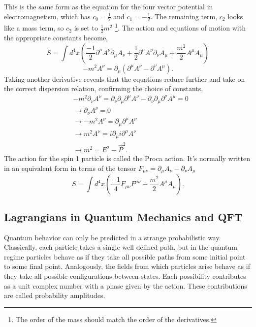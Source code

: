 This is the same form as the equation for the four vector potential in electromagnetism, which has $c_0 = \frac{1}{2}$ and $c_1 =-\frac{1}{2}$. The remaining term, $c_2$ looks like a mass term, so $c_2$ is set to $\frac{1}{2}m^2$ \footnote{The order of the mass should match the order of the derivatives.}. The action and equations of motion with the appropriate constants become, 
\begin{equation}
S = \int d^4x \left( \frac{-1}{2} \partial^\mu A^\nu\partial_\mu A_\nu + \frac{1}{2} \partial^\mu A^\nu\partial_\nu A_\mu + \frac{m^2}{2} A^\mu A_\mu \right)
\end{equation}
\begin{equation}
-m^2 A^\nu = \partial_\mu\left(\partial^\mu A^\nu - \partial^\nu A^\mu\right).
\end{equation}
Taking another derivative reveals that the equations reduce further and take on the correct dispersion relation, confirming the choice of constants,
\begin{equation}
\begin{split}
&-m^2 \partial_\nu A^\nu = \partial_\nu \partial_\mu \partial^\mu A^\nu - \partial_\nu \partial_\mu \partial^\nu A^\mu = 0 \\
&\rightarrow \partial_\nu A^\nu = 0 \\
&\rightarrow -m^2 A^\nu = \partial_\mu\partial^\mu A^\nu \\
&\rightarrow m^2 A^\nu = i\partial_\mu i\partial^\mu A^\nu \\
&\rightarrow m^2 = E^2 - \vec{P}^2.
\end{split}
\end{equation}
The action for the spin 1 particle is called the Proca action. It's normally written in an equivalent form in terms of the tensor $F_{\mu\nu} = \partial_\mu A_\nu - \partial_\nu A_\mu$
\begin{equation}
S = \int d^4x \left( \frac{-1}{4}F_{\mu\nu}F^{\mu\nu}  + \frac{m^2}{2} A^\mu A_\mu \right).
\end{equation}

\subsection{Lagrangians in Quantum Mechanics and QFT}

Quantum behavior can only be predicted in a strange probabilistic way. Classically, each particle takes a single well defined path, but in the quantum regime particles behave as if they take all possible paths from some initial point to some final point. Analogously, the fields from which particles arise behave as if they take all possible configurations between states. Each possibility contributes as a unit complex number with a phase given by the action. These contributions are called probability amplitudes. 

